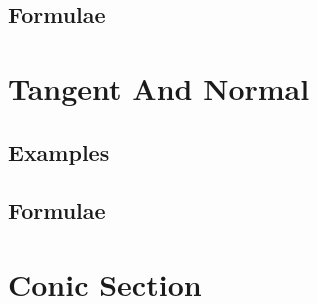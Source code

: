 \documentclass[journal]{IEEEtran}
\begin{document}
\subsection{Formulae}

\newpage
\section{Tangent And Normal}
\subsection{Examples}

\subsection{Formulae}

%
%
%

%
\appendices
\section{Conic Section}

\end{document}
